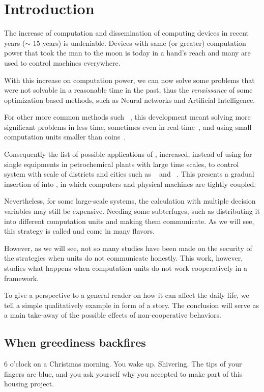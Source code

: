 \documentclass[../main.tex]{subfiles}
\begin{document}
\chapter{Introduction}\label{sec:introduction}
The increase of computation and dissemination of computing devices in recent years ($\sim$ 15 years) is undeniable.
Devices with same (or greater) computation power that took the man to the moon is today in a hand's reach and many are used to control machines everywhere.

With this increase on computation power, we can now solve some problems that were not solvable in a reasonable time in the past, thus the \emph{renaissance} of some optimization based methods, such as Neural networks and Artificial Intelligence.

For other more common methods such \mpc~\cite{GarciaEtAl1989}, this development meant solving more significant problems in less time, sometimes even in real-time~\cite{BesselmannEtAl2008}, and using small computation units smaller than coins~\cite{BanguraMahony2014}.

Consequently the list of possible applications of \mpc{}, increased, instead of using for single equipments in petrochemical plants with large time scales, to control system with scale of districts and cities such as \wdns~\cite{ZhangEtAl2021} and \dhns~\cite{TaylorEtAl2021}.
This presents a gradual insertion of \mpc{} into \cps{}, in which computers and physical machines are tightly coupled.

Nevertheless, for some large-scale systems, the calculation with multiple decision variables may still be expensive.
Needing some subterfuges, such as distributing it into different computation units and making them communicate.
As we will see, this strategy is called \dmpc and come in many flavors.

However, as we will see, not so many studies have been made on the security of the \dmpc{} strategies when units do not communicate honestly.
This work, however, studies what happens when computation units do not work cooperatively in a \dmpc{} framework.

To give a perspective to a general reader on how it can affect the daily life, we tell a simple qualitatively example in form of a story. The conclusion will serve as a main take-away of the possible effects of non-cooperative behaviors.
\newpage
\section{When greediness backfires}
6 o'clock on a Christmas morning.
You wake up.
Shivering.
The tips of your fingers are blue, and you ask yourself why you accepted to make part of this housing project.
\end{document}

